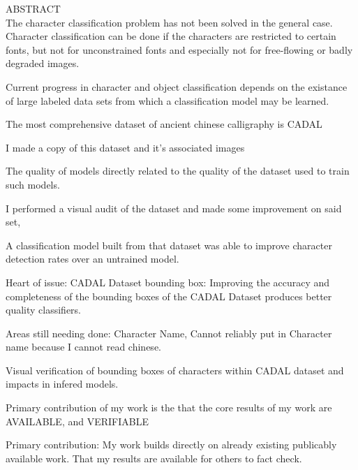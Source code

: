 ABSTRACT\\

The character classification problem has not been solved in the general case.  Character classification can be done if the characters are restricted to certain fonts, but not for unconstrained fonts and especially not for free-flowing or badly degraded images.

Current progress in character and object classification depends on the existance of large labeled data sets from which a classification model may be learned.

The most comprehensive dataset of ancient chinese calligraphy is CADAL

I made a copy of this dataset and it's associated images

The quality of models directly related to the quality of the dataset used to train such models.

I performed a visual audit of the dataset and made some improvement on said set,

A classification model built from that dataset was able to improve character detection rates over an untrained model.

Heart of issue:  CADAL Dataset bounding box:  Improving the accuracy and completeness of the bounding boxes of the CADAL Dataset produces better quality classifiers.


Areas still needing done:  Character Name,  Cannot reliably put in Character name because I cannot read chinese.

Visual verification of bounding boxes of characters within CADAL dataset and impacts in infered models.


Primary contribution of my work is the that the core results of my work are AVAILABLE, and VERIFIABLE

Primary contribution:  My work builds directly on already existing publicably available work.  That my results are available for others to fact check.

\newpage
